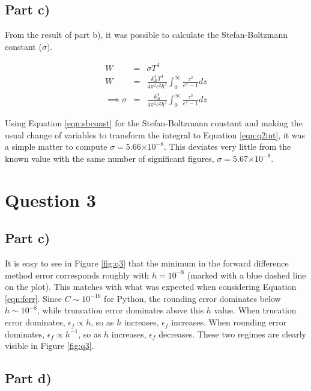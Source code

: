 \documentclass[a4paper,12pt]{article}
\providecommand{\e}[1]{\ensuremath{\times 10^{#1}}}
\begin{document}
\subsection{Part c)}

From the result of part b), it was possible to calculate the Stefan-Boltzmann constant ($\sigma$).

\begin{eqnarray}
W &=& \sigma T^4\nonumber\\
W &=& \frac{k_B^4 T^4}{4\pi^2c^2\hbar^3}\int_0^{\infty}\frac{z^3}{e^z - 1}dz\nonumber\\
\implies \sigma &=& \frac{k_B^4}{4\pi^2c^2\hbar^3}\int_0^{\infty}\frac{z^3}{e^z - 1}dz
\label{eqn:sbconst}
\end{eqnarray}

Using Equation \ref{eqn:sbconst} for the Stefan-Boltzmann constant and making the usual change of variables to transform the integral to Equation \ref{eqn:q2int}, it was a simple matter to compute $\sigma = 5.66\e{-8}$. This deviates very little from the known value with the same number of significant figures, $\sigma = 5.67\e{-8}$.

\section{Question 3}
\subsection{Part c)}

It is easy to see in Figure \ref{fig:q3} that the minimum in the forward difference method error corresponds roughly with $h = 10^{-8}$ (marked with a blue dashed line on the plot). This matches with what was expected when considering Equation \ref{eqn:ferr}. Since $C\sim10^{-16}$ for Python, the rounding error dominates below $h\sim 10^{-8}$, while truncation error dominates above this $h$ value. When trucation error dominates, $\epsilon_f \propto h$, so as $h$ increases, $\epsilon_f$ increases. When rounding error dominates, $\epsilon_f \propto h^{-1}$, so as $h$ increases, $\epsilon_f$ decreases. These two regimes are clearly visible in Figure \ref{fig:q3}.

\subsection{Part d)} 
\end{document}
